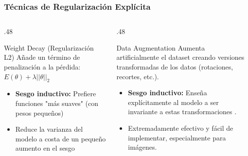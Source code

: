 \documentclass[aspectratio=169, 10pt]{beamer}
\begin{document}
\begin{frame}
	\frametitle{Técnicas de Regularización Explícita}
	
	\begin{columns}[T]
		\begin{column}{.48\textwidth}
			\begin{block}{Weight Decay (Regularización L2)}
				Añade un término de penalización a la pérdida: \( E(\theta) + \lambda || \theta||_2 \)
				\begin{itemize}
					\item[-] \textbf{Sesgo inductivo:} Prefiere funciones "más suaves" (con pesos pequeños)
					\item[-] Reduce la varianza del modelo a costa de un pequeño aumento en el sesgo
				\end{itemize}
			\end{block}
		\end{column}
			\begin{column}{.48\textwidth}
			\begin{block}{Data Augmentation}
				Aumenta artificialmente el dataset creando versiones transformadas de los datos (rotaciones, recortes, etc.).
				\begin{itemize}
					\item[-] \textbf{Sesgo inductivo:} Enseña explícitamente al modelo a ser invariante a estas transformaciones .
					\item[-] Extremadamente efectivo y fácil de implementar, especialmente para imágenes.
				\end{itemize}
			\end{block}
		\end{column}
		
	
	\end{columns}
\end{frame}
\end{document}

